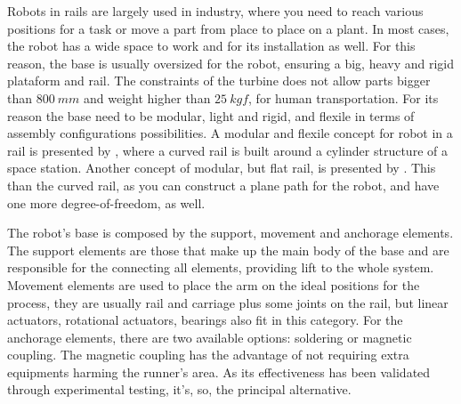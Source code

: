 Robots in rails are largely used in industry, where you need to reach various
positions for a task or move a part from place to place on a plant.
In most cases, the robot has a wide space to work and for its installation as
well. For this reason, the base is usually oversized for the robot, ensuring a
big, heavy and rigid plataform and rail. The constraints of the turbine does not
allow parts bigger than $800~mm$ and weight higher than $25~kgf$, for human
transportation.
For its reason the base need to be modular, light and rigid, and flexile in
terms of assembly configurations possibilities.
A modular and flexile concept for robot in a rail is presented by
\cite{Chen2012}, where a curved rail is built around a cylinder structure of a
space station.
Another concept of modular, but flat rail, is presented by \cite{Moon2015}. This
than the curved rail, as you can construct a plane path for the robot, and have
one more degree-of-freedom, as well.

The robot's base is composed by the support, movement and anchorage elements.
The support elements are those that make up the main body of the base and are
responsible for the connecting all elements, providing lift to the whole system.
Movement elements are used to place the arm on the ideal positions for the
process, they  are usually rail and carriage plus some joints on the rail, but
linear actuators, rotational actuators, bearings also fit in this category. For
the anchorage elements, there are two available options: soldering or magnetic
coupling. The magnetic coupling has the advantage of not requiring extra
equipments harming the runner's area. As its effectiveness has been
validated through experimental testing, it's, so, the principal alternative.







